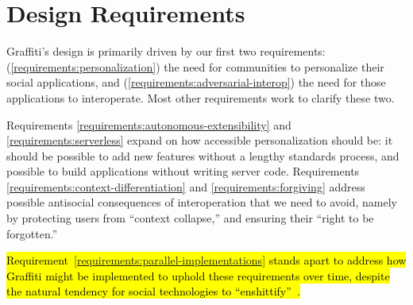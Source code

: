 \newtheorem{requirement}{Requirement}

\section{Design Requirements}
\label{requirements}

Graffiti's design is primarily driven by our
first two requirements:
(\ref{requirements:personalization})
the need for communities to personalize
their social applications,
and (\ref{requirements:adversarial-interop})
the need for those applications to interoperate.
Most other requirements work to clarify these two.

Requirements \ref{requirements:autonomous-extensibility}
and \ref{requirements:serverless} expand on how accessible
personalization should be: it should be possible to add new features
without a lengthy standards process, and possible to build
applications without writing server code.
Requirements \ref{requirements:context-differentiation}
and \ref{requirements:forgiving}
address possible antisocial consequences of
interoperation that we need to avoid,
namely by protecting users from ``context collapse,''
and ensuring their ``right to be forgotten.''

\hl{%
Requirement~{\ref{requirements:parallel-implementations}} stands apart to address
how Graffiti might be implemented to uphold these requirements over time, despite
the natural tendency for social technologies to ``enshittify''~{\cite{enshittification}}.
}%





